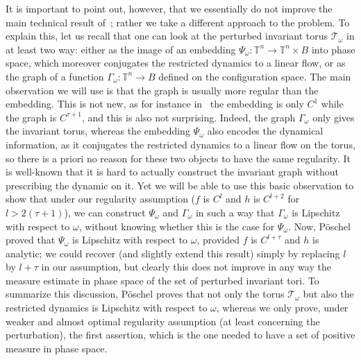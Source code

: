 \documentclass[11pt]{article}
\let\mathcal\mathscr
\numberwithin{equation}{section}
\theoremstyle{plain}
\theoremstyle{definition}
\newcommand\T{\mathbb T}
\begin{document}
It is important to point out, however, that we essentially do not improve the main technical result of~\cite{Pos82}; rather we take a different approach to the problem. To explain this, let us recall that one can look at the perturbed invariant torus $\mathcal{T}_\omega$ in at least two way: either as the image of an embedding $\Psi_\omega : \T^n \to \T^n \times B$ into phase space, which moreover conjugates the restricted dynamics to a linear flow, or as the graph of a function $\Gamma_\omega : \T^n \to B$ defined on the configuration space. The main observation we will use is that the graph is usually more regular than the embedding. This is not new, as for instance in~\cite{Sal04} the embedding is only $C^1$ while the graph is $C^{\tau+1}$, and this is also not surprising. Indeed, the graph $\Gamma_\omega$ only gives the invariant torus, whereas the embedding $\Psi_\omega$ also encodes the dynamical information, as it conjugates the restricted dynamics to a linear flow on the torus, so there is a priori no reason for these two objects to have the same regularity. It is well-known that it is hard to actually construct the invariant graph without prescribing the dynamic on it. Yet we will be able to use this basic observation to show that under our regularity assumption ($f$ is $C^l$ and $h$ is $C^{l+2}$ for $l>2(\tau+1)$), we can construct $\Psi_\omega$ and $\Gamma_\omega$ in such a way that $\Gamma_\omega$ is Lipschitz with respect to $\omega$, without knowing whether this is the case for $\Psi_\omega$. Now, Pöschel proved that $\Psi_\omega$ is Lipschitz with respect to $\omega$, provided $f$ is $C^{l+\tau}$ and $h$ is analytic; we could recover (and slightly extend this result) simply by replacing $l$ by $l+\tau$ in our assumption, but clearly this does not improve in any way the measure estimate in phase space of the set of perturbed invariant tori. To summarize this discussion, Pöschel proves that not only the torus $\mathcal{T}_\omega$ but also the restricted dynamics is Lipschitz with respect to $\omega$, whereas we only prove, under weaker and almost optimal regularity assumption (at least concerning the perturbation), the first assertion, which is the one needed to have a set of positive measure in phase space.
\end{document}
